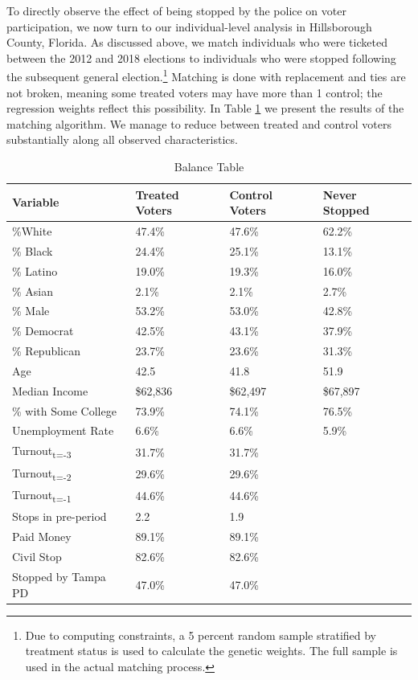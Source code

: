 \documentclass[
  12pt,
]{article}
\begin{document}
To directly observe the effect of being stopped by the police on voter participation, we now turn to our individual-level analysis in Hillsborough County, Florida. As discussed above, we match individuals who were ticketed between the 2012 and 2018 elections to individuals who were stopped following the subsequent general election.\footnote{Due to computing constraints, a 5 percent random sample stratified by treatment status is used to calculate the genetic weights. The full sample is used in the actual matching process.} Matching is done with replacement and ties are not broken, meaning some treated voters may have more than 1 control; the regression weights reflect this possibility. In Table \ref{tab:balance} we present the results of the matching algorithm. We manage to reduce between treated and control voters substantially along all observed characteristics.

\begin{singlespace}
\begin{table}[!h]

\caption{\label{tab:baltab-chunk}\label{tab:balance} Balance Table}
\centering
\begin{tabular}[t]{llll}
\toprule
Variable & Treated Voters & Control Voters & Never Stopped\\
\midrule
\%White & 47.4\% & 47.6\% & 62.2\%\\
\% Black & 24.4\% & 25.1\% & 13.1\%\\
\% Latino & 19.0\% & 19.3\% & 16.0\%\\
\% Asian & 2.1\% & 2.1\% & 2.7\%\\
\% Male & 53.2\% & 53.0\% & 42.8\%\\
\% Democrat & 42.5\% & 43.1\% & 37.9\%\\
\% Republican & 23.7\% & 23.6\% & 31.3\%\\
Age & 42.5 & 41.8 & 51.9\\
Median Income & \$62,836 & \$62,497 & \$67,897\\
\% with Some College & 73.9\% & 74.1\% & 76.5\%\\
Unemployment Rate & 6.6\% & 6.6\% & 5.9\%\\
Turnout\textsubscript{t=-3} & 31.7\% & 31.7\% & \\
Turnout\textsubscript{t=-2} & 29.6\% & 29.6\% & \\
Turnout\textsubscript{t=-1} & 44.6\% & 44.6\% & \\
Stops in pre-period & 2.2 & 1.9 & \\
Paid Money & 89.1\% & 89.1\% & \\
Civil Stop & 82.6\% & 82.6\% & \\
Stopped by Tampa PD & 47.0\% & 47.0\% & \\
\bottomrule
\end{tabular}
\end{table}
\end{singlespace}
\end{document}
